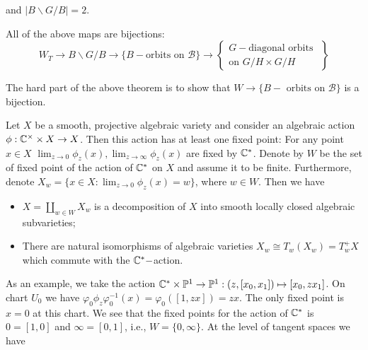 \begin{itemize}
\begin{example}
        and $|B\backslash G/B|=2$.
    \end{example}
    \begin{theorem}
        All of the above maps are bijections:
        \begin{equation}
            W_T \to B\backslash G/B\to \{B-\text{orbits on }\mathcal{B}\}\to
              \left\{\begin{matrix}G-\text{diagonal orbits }\\\text{on }G/H\times G/H\end{matrix}\right\}
        \end{equation}
    \end{theorem}

    The hard part of the above theorem is to show that $W\to \{B-\text{ orbits on }\mathcal{B}\}$ is a bijection. 
    \begin{theorem}
        Let $X$ be a smooth, projective algebraic variety and consider an algebraic action $\phi:\mathbb{C}^\times\times X\to X$. 
        Then this action has at least one fixed point: For any point $x\in X$
        $\lim_{z\to 0}\phi_z(x), \lim_{z\to\infty}\phi_z(x)$ are fixed by $\mathbb{C}^*$. Denote by $W$ be the set of 
        fixed point of the action of $\mathbb{C}^*$ on $X$ and assume it to be finite. Furthermore, denote 
        $X_w = \{x\in X:\lim_{z\to0}\phi_z(x)=w\}$, where $w\in W$. Then we have 
        \begin{itemize}
            \item[(1)] $X=\coprod_{w\in W}X_w$ is a decomposition of $X$ into smooth locally closed algebraic subvarieties;
            \item[(2)] There are natural isomorphisms of algebraic varieties $X_w\cong T_w(X_w) = T_w^+X$ which 
            commute with the $\mathbb{C}^*-$action.
        \end{itemize} 
    \end{theorem}
    As an example, we take the action $\mathbb{C}^*\times \mathbb{P}^1\to \mathbb{P}^1:(z,[x_0,x_1])\mapsto [x_0,zx_1]$. On chart $U_0$ we have
    $\varphi_0\phi_z\varphi_0^{-1}(x)=\varphi_0([1,zx])=zx$. The only fixed point is $x=0$ at this chart. We see that 
    the fixed points for the action of $\mathbb{C}^*$ is $0=[1,0]$ and $\infty=[0,1]$, i.e., $W=\{0,\infty\}$. 
    At the level of tangent spaces we have 
    \begin{center}
\end{center}
\end{itemize}
